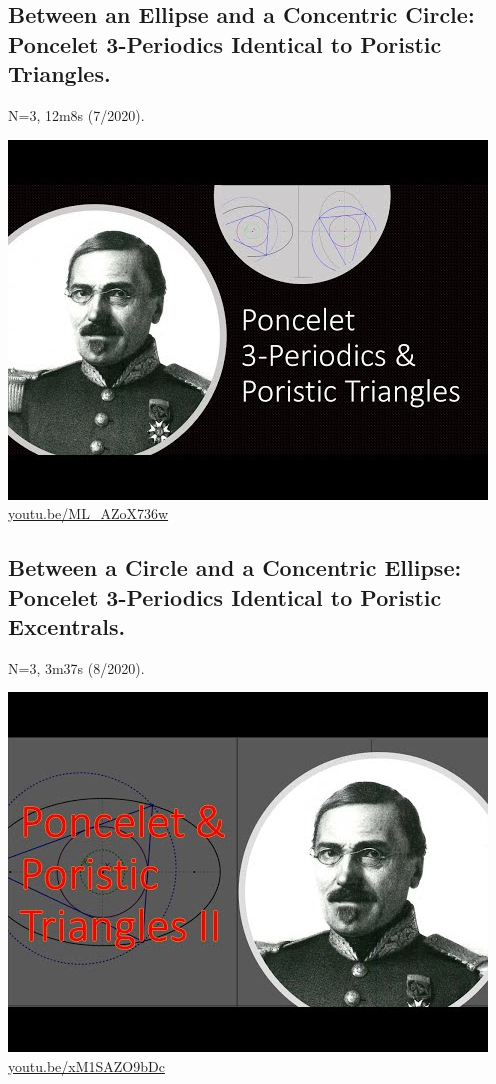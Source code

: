 \documentclass[12pt]{amsart}
\begin{document}
\subsection{Between an Ellipse and a Concentric Circle: Poncelet 3-Periodics Identical to Poristic Triangles.}
\label{vid:ML_AZoX736w}
\noindent N=3, 12m8s (7/2020). 
\begin{center}\includegraphics[width=.5\textwidth]{pics/ML_AZoX736w.jpg} \\ 
\href{https://youtu.be/ML_AZoX736w}{\url{youtu.be/ML\_AZoX736w}}\end{center}
% 

\subsection{Between a Circle and a Concentric Ellipse: Poncelet 3-Periodics Identical to Poristic Excentrals.}
\label{vid:xM1SAZO9bDc}
\noindent N=3, 3m37s (8/2020). 
\begin{center}\includegraphics[width=.5\textwidth]{pics/xM1SAZO9bDc.jpg} \\ 
\href{https://youtu.be/xM1SAZO9bDc}{\url{youtu.be/xM1SAZO9bDc}}\end{center}
% 
\end{document}
